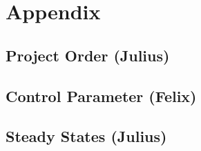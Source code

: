 \chapter{Appendix}
\section{Project Order (Julius)}
\section{Control Parameter (Felix)}
\section{Steady States (Julius)}
